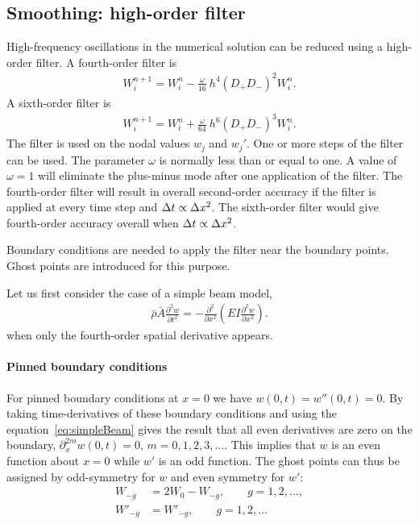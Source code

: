 \documentclass[11pt]{article}
\newcommand{\dt}{{\Delta t}}
\newcommand{\rhos}{\bar{\rho}}
\newcommand{\As}{\bar{A}}
\begin{document}
\subsection{Smoothing: high-order filter} \label{eq:BeamModel_FEM_SMOOTHER}

High-frequency oscillations in the numerical solution can be reduced using a 
high-order filter.
A fourth-order filter is 
\begin{align}
   W_i^{n+1}    = W_i^n - \frac{\omega}{16} ~ h^4 (D_+D_-)^2 W_i^n .
\end{align}
A sixth-order filter is 
\begin{align}
W_i^{n+1}    = W_i^n + \frac{\omega}{64} ~ h^6 (D_+D_-)^3 W_i^n .
\end{align}
The filter is used on the nodal values  $w_j$ and $w_j'$. 
One or more steps of the filter can be used. The parameter $\omega$ is normally less than or equal to one.
A value of $\omega=1$ will eliminate the plus-minus mode after one application of the filter.
The fourth-order filter will result in overall second-order accuracy if the filter is applied at every
time step and $\dt \propto \dx^2$. The sixth-order filter would give fourth-order accuracy overall when $\dt \propto \dx^2$.

Boundary conditions are needed to apply the filter near the boundary points.
Ghost points are introduced for this purpose.

Let us first consider the case of a simple beam model,
\begin{align}
  \rhos \As \frac{\partial^2 w}{\partial t^2} = 
                   - \frac{\partial^2}{\partial x^2}\left( E I \frac{\partial^2 w}{\partial x^2}\right) . \label{eq:simpleBeam}
\end{align}
when only the fourth-order spatial derivative appears.

\paragraph{Pinned boundary conditions}
For pinned boundary conditions at $x=0$ we have $w(0,t)=w''(0,t)=0$. 
By taking time-derivatives of these boundary conditions and using the equation~\eqref{eq:simpleBeam}
gives the result that all even derivatives are zero on the boundary, $\partial_x^{2m} w(0,t)=0$, $m=0,1,2,3,\ldots$.
This implies that $w$ is an even function about $x=0$ while $w'$ is an odd function.
The ghost points can thus be assigned by odd-symmetry for $w$ and even symmetry for $w'$:
\begin{align}
  W_{-g} &= 2 W_0 - W_{-g}, \qquad g=1,2,\ldots, \\
  W'_{-g} &= W'_{-g}, \qquad g=1,2,\ldots
\end{align}
\end{document}
